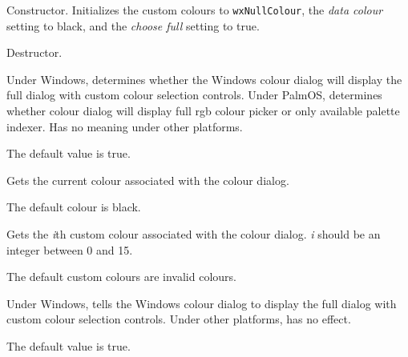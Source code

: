 

\label{wxcolourdatactor}


Constructor. Initializes the custom colours to {\tt wxNullColour},
the {\it data colour} setting
to black, and the {\it choose full} setting to true.


\label{wxcolourdatadtor}


Destructor.


\label{wxcolourdatagetchoosefull}


Under Windows, determines whether the Windows colour dialog will display the full dialog
with custom colour selection controls. Under PalmOS, determines whether colour dialog
will display full rgb colour picker or only available palette indexer.
Has no meaning under other platforms.

The default value is true.


\label{wxcolourdatagetcolour}


Gets the current colour associated with the colour dialog.

The default colour is black.


\label{wxcolourdatagetcustomcolour}


Gets the {\it i}th custom colour associated with the colour dialog. {\it i} should
be an integer between 0 and 15.

The default custom colours are invalid colours.


\label{wxcolourdatasetchoosefull}


Under Windows, tells the Windows colour dialog to display the full dialog
with custom colour selection controls. Under other platforms, has no effect.

The default value is true.


